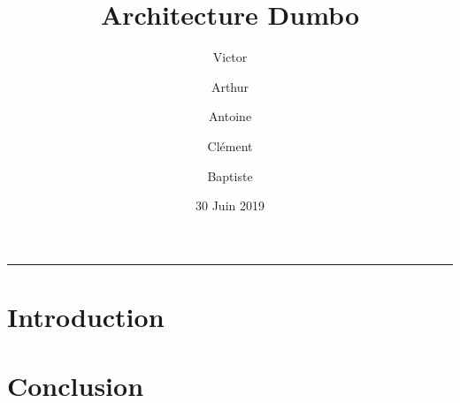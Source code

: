 \documentclass{article}
\title{Architecture Dumbo}
\date{30 Juin 2019}
\author{Victor \bsc{Zimmerman} \and Arthur \bsc{Bruneel} \and Antoine \bsc{Caillet} \and Clément \bsc{Boutin} \and Baptiste \bsc{Saclier}}
\begin{document}
\maketitle

\begin{center}
\rule{0.5\textwidth}{0.4pt}
\end{center}

\bigskip

\tableofcontents

\clearpage

\section{Introduction}






\section{Conclusion}

\end{document}
